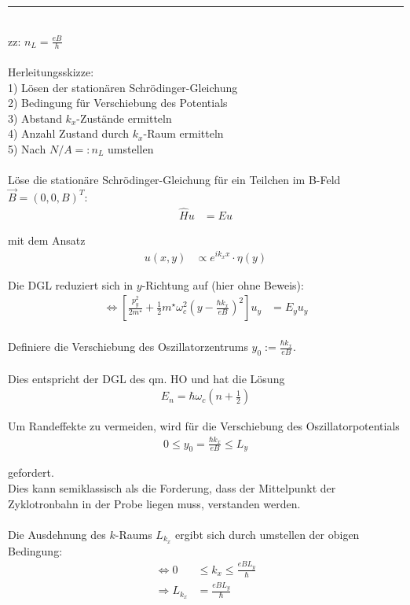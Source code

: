 \documentclass{article}
\newcommand{\lr}[1]{\left(#1\right)}
\newcommand{\lreck}[1]{\left[#1\right]}
\begin{document}
\newpage


{\color{violet}
\hrule
	\\
	zz: $n_L = \frac{eB}{h}$\\
	\\
	Herleitungsskizze:\\
	1) Lösen der stationären Schrödinger-Gleichung \\
	2) Bedingung für Verschiebung des Potentials \\
	3) Abstand $k_x$-Zustände ermitteln \\
	4) Anzahl Zustand durch $k_x$-Raum ermitteln \\
	5) Nach $N/A =: n_L$ umstellen \\
	\\
	Löse die stationäre Schrödinger-Gleichung für ein Teilchen im B-Feld $\vec{B} = (0,0,B)^T$:
		\begin{align*}
			\hat{H} u &= E u
		\end{align*}
	
	mit dem Ansatz
		\begin{align*}
			u(x,y) &\propto e^{i k_x x} \cdot \eta(y)
		\end{align*}
	
	Die DGL reduziert sich in $y$-Richtung auf \textcolor{gruen}{(hier ohne Beweis)}:
		\begin{align*}
			\Leftrightarrow \lreck{ \frac{p_y^2}{2m^\star} + \frac{1}{2} m^\star \omega_c^2 \lr{ y - \frac{ \hbar k_x }{e B} }^2 } u_y &= E_y u_y \\
		\end{align*}
	
	Definiere die Verschiebung des Oszillatorzentrums $y_0 := \frac{\hbar k_x}{e B}$.\\
	\\
	Dies entspricht der DGL des qm. HO und hat die Lösung
		\begin{align*}
			E_n = \hbar \omega_c \lr{ n + \frac{1}{2} }
		\end{align*}
	
	Um Randeffekte zu vermeiden, wird für die Verschiebung des Oszillatorpotentials
		\begin{align*}
			0 \leq y_0 = \frac{\hbar k_x}{e B} \leq L_y
		\end{align*}
	
	gefordert.\\
	Dies kann semiklassisch als die Forderung, dass der Mittelpunkt der Zyklotronbahn in der Probe liegen muss, verstanden werden.\\
	\\
	Die Ausdehnung des $k$-Raums $L_{k_x}$ ergibt sich durch umstellen der obigen Bedingung:
		\begin{align*}
			\Leftrightarrow 0 &\leq k_x \leq \frac{e B L_y}{\hbar} \\
			\Rightarrow L_{k_x} &= \frac{e B L_y}{\hbar}
		\end{align*}
	
}
\end{document}
